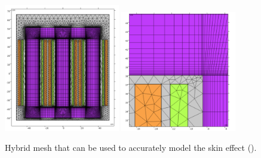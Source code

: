 \begin{figure}
    \centering
    \begin{multicols}{2}
        \includegraphics[width=0.45\textwidth]{img/hybrid_mesh_full.png}
        \includegraphics[width=0.45\textwidth]{img/hybrid_mesh.png}
    \end{multicols}
    \caption{Hybrid mesh that can be used to accurately model the skin effect (\cite{vanDijk2022}).}
    \label{fig:mesh_hybrid}
\end{figure}
